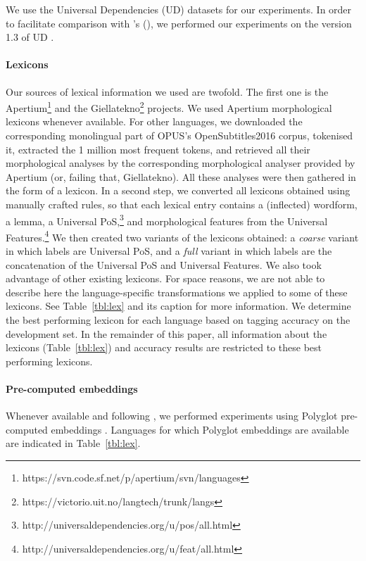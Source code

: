 \documentclass[11pt,a4paper]{article}
\begin{document}
We use the Universal Dependencies (UD) datasets for our experiments. In order to facilitate comparison with
\citeauthor{plank16}'s (\citeyear{plank16}), we performed our experiments on the version 1.3 of UD \cite{ud13}.

\paragraph{Lexicons}

Our sources of lexical information we used are twofold. The first one is the
Apertium\footnote{https://svn.code.sf.net/p/apertium/svn/languages} and the
Giellatekno\footnote{https://victorio.uit.no/langtech/trunk/langs} projects. We used Apertium morphological lexicons
whenever available. For other languages, we downloaded the corresponding monolingual part of OPUS's OpenSubtitles2016
corpus, tokenised it, extracted the 1 million most frequent tokens, and retrieved all their morphological analyses by
the corresponding morphological analyser provided by Apertium (or, failing that, Giellatekno). All these analyses were
then gathered in the form of a lexicon. In a second step, we converted all lexicons obtained using manually crafted
rules, so that each lexical entry contains a (inflected) wordform, a lemma, a Universal
PoS,\footnote{http://universaldependencies.org/u/pos/all.html} and morphological features from the Universal
Features.\footnote{http://universaldependencies.org/u/feat/all.html} We then created two variants of the lexicons
obtained: a {\em coarse} variant in which labels are Universal PoS, and a {\em full} variant in which labels are the
concatenation of the Universal PoS and Universal Features. We also took advantage of other existing lexicons. For space
reasons, we are not able to describe here the language-specific transformations we applied to some of these
lexicons. See Table~\ref{tbl:lex} and its caption for more information. We determine the best performing lexicon for
each language based on tagging accuracy on the development set. In the remainder of this paper, all information about
the lexicons (Table~\ref{tbl:lex}) and accuracy results are restricted to these best performing lexicons.

\paragraph{Pre-computed embeddings}


Whenever available and following \citet{plank16}, we performed experiments using Polyglot pre-computed
embeddings \cite{alrfou13}. Languages for which Polyglot embeddings are available are indicated in Table~\ref{tbl:lex}.
\end{document}
